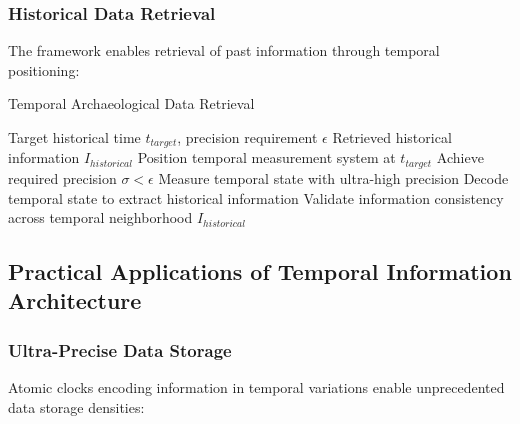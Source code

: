 \documentclass[12pt,a4paper]{article}
\begin{document}
{{{{{{{{{{{{{{\subsubsection{Historical Data Retrieval}

The framework enables retrieval of past information through temporal positioning:

\begin{algorithm}[H]
\caption{Temporal Archaeological Data Retrieval}
\begin{algorithmic}[1]
\REQUIRE Target historical time $t_{target}$, precision requirement $\epsilon$
\ENSURE Retrieved historical information $I_{historical}$
\STATE Position temporal measurement system at $t_{target}$
\STATE Achieve required precision $\sigma < \epsilon$
\STATE Measure temporal state with ultra-high precision
\STATE Decode temporal state to extract historical information
\STATE Validate information consistency across temporal neighborhood
\RETURN $I_{historical}$
\end{algorithmic}
\end{algorithm}

\subsection{Practical Applications of Temporal Information Architecture}

\subsubsection{Ultra-Precise Data Storage}

Atomic clocks encoding information in temporal variations enable unprecedented data storage densities:

\begin{figure}[H]
\centering
{}
\end{figure}}}}}}}}}}}}}}}
\end{document}
